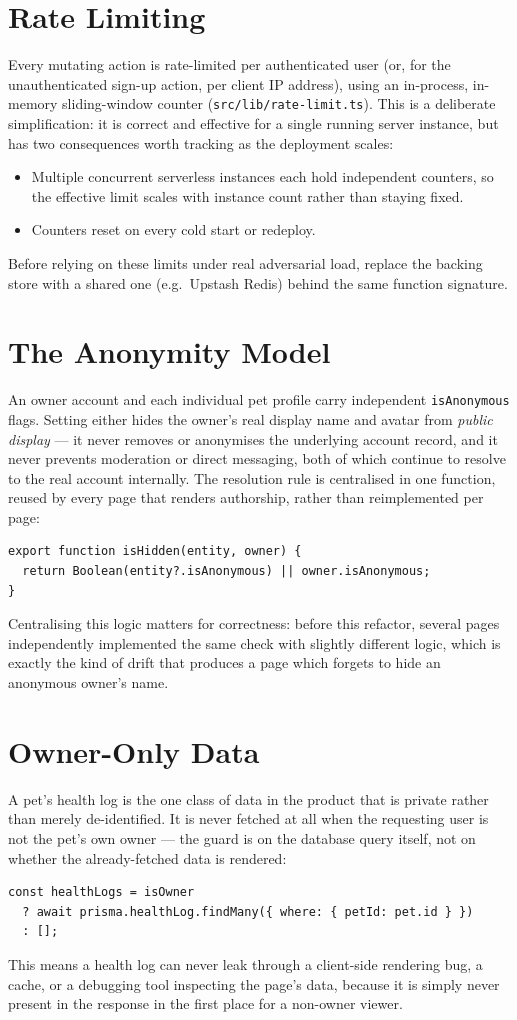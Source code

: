 \documentclass[11pt,a4paper]{article}
\begin{document}
\section{Rate Limiting}
Every mutating action is rate-limited per authenticated user (or, for the unauthenticated
sign-up action, per client IP address), using an in-process, in-memory sliding-window
counter (\texttt{src/lib/rate-limit.ts}). This is a deliberate simplification: it is
correct and effective for a single running server instance, but has two consequences
worth tracking as the deployment scales:
\begin{itemize}[leftmargin=*]
  \item Multiple concurrent serverless instances each hold independent counters, so the
        effective limit scales with instance count rather than staying fixed.
  \item Counters reset on every cold start or redeploy.
\end{itemize}
Before relying on these limits under real adversarial load, replace the backing store
with a shared one (e.g.\ Upstash Redis) behind the same function signature.

\section{The Anonymity Model}
An owner account and each individual pet profile carry independent
\texttt{isAnonymous} flags. Setting either hides the owner's real display name and
avatar from \emph{public display} --- it never removes or anonymises the underlying
account record, and it never prevents moderation or direct messaging, both of which
continue to resolve to the real account internally. The resolution rule is centralised
in one function, reused by every page that renders authorship, rather than
reimplemented per page:
\begin{lstlisting}
export function isHidden(entity, owner) {
  return Boolean(entity?.isAnonymous) || owner.isAnonymous;
}
\end{lstlisting}
Centralising this logic matters for correctness: before this refactor, several pages
independently implemented the same check with slightly different logic, which is
exactly the kind of drift that produces a page which forgets to hide an anonymous
owner's name.

\section{Owner-Only Data}
A pet's health log is the one class of data in the product that is private rather than
merely de-identified. It is never fetched at all when the requesting user is not the
pet's own owner --- the guard is on the database query itself, not on whether the
already-fetched data is rendered:
\begin{lstlisting}
const healthLogs = isOwner
  ? await prisma.healthLog.findMany({ where: { petId: pet.id } })
  : [];
\end{lstlisting}
This means a health log can never leak through a client-side rendering bug, a cache, or
a debugging tool inspecting the page's data, because it is simply never present in the
response in the first place for a non-owner viewer.
\end{document}
